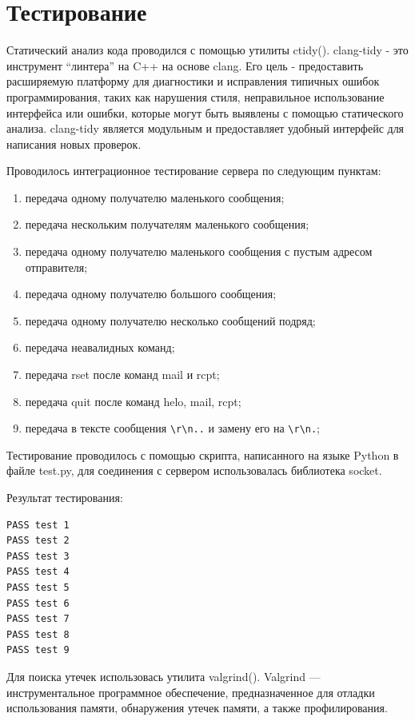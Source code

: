 \documentclass[a4paper,12pt]{report}
\begin{document}
\newpage


\section{Тестирование}
Статический анализ кода проводился с помощью утилиты ctidy(\cite{ctidy}). clang-tidy - это инструмент “линтера” на C++ на основе clang. Его цель - предоставить расширяемую платформу для диагностики и исправления типичных ошибок программирования, таких как нарушения стиля, неправильное использование интерфейса или ошибки, которые могут быть выявлены с помощью статического анализа. clang-tidy является модульным и предоставляет удобный интерфейс для написания новых проверок.

Проводилось интеграционное тестирование сервера по следующим пунктам:
\begin{enumerate}
	\item передача одному получателю маленького сообщения;
	\item передача нескольким получателям маленького сообщения;
	\item передача одному получателю маленького сообщения с пустым адресом отправителя;
    \item передача одному получателю большого сообщения;
    \item передача одному получателю несколько сообщений подряд;
    \item передача неавалидных команд;
    \item передача rset после команд mail и rcpt;
    \item передача quit после команд helo, mail, rcpt;
    \item передача в тексте сообщения \texttt{\textbackslash{}r\textbackslash{}n..} и замену его на \texttt{\textbackslash{}r\textbackslash{}n.};
\end{enumerate}

Тестирование проводилось с помощью скрипта, написанного на языке Python в файле test.py, для соединения с сервером использовалась библиотека socket.

Результат тестирования:
\begin{verbatim}
PASS test 1
PASS test 2
PASS test 3
PASS test 4
PASS test 5
PASS test 6
PASS test 7
PASS test 8
PASS test 9
\end{verbatim}


Для поиска утечек использовась утилита valgrind(\cite{valgrind}). Valgrind — инструментальное программное обеспечение, предназначенное для отладки использования памяти, обнаружения утечек памяти, а также профилирования. 
\end{document}

